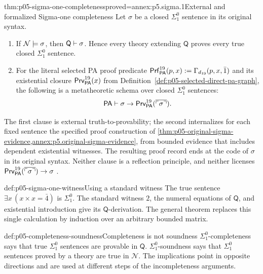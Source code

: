 \begin{hbtheorem}{thm:p05-sigma-one-completeness}{proved=annex:p5.sigma.1}{External and formalized Sigma-one completeness}
Let \(\sigma\) be a closed \(\Sigma^0_1\) sentence in its original syntax.
\begin{enumerate}
  \item If \(\mathcal N\models\sigma\), then
        \(\mathsf Q\vdash\sigma\).  Hence every theory extending
        \(\mathsf Q\) proves every true closed \(\Sigma^0_1\) sentence.
  \item For the literal selected PA proof predicate
        \(\mathsf{Prf}^{19}_{\mathsf{PA}}(p,x)\mathrel{:=}
          \Gamma_{d_{19}}(p,x,\bar1)\) and its existential closure
        \(\mathsf{Prv}^{19}_{\mathsf{PA}}(x)\) from
        Definition~\ref{def:p05-selected-direct-pa-graph}, the following is a
        metatheoretic schema over closed \(\Sigma^0_1\) sentences:
        \[
          \mathsf{PA}\vdash
          \sigma\to
          \mathsf{Prv}^{19}_{\mathsf{PA}}(\overline{\ulcorner\sigma\urcorner}).
        \]
\end{enumerate}
The first clause is external truth-to-provability; the second internalizes
for each fixed sentence the specified proof construction of
\cref{thm:p05-original-sigma-evidence,annex:p5.original-sigma-evidence},
from bounded evidence that includes dependent existential witnesses.
The resulting proof record ends at the code of \(\sigma\) in its
original syntax. Neither clause is a reflection
principle, and neither licenses
\(\mathsf{Prv}^{19}_{\mathsf{PA}}(\overline{\ulcorner\sigma\urcorner})\to\sigma\)
\cite{Shoenfield1967,HilbertBernays1939}.
\end{hbtheorem}

\begin{hbexample}{def:p05-sigma-one-witness}{Using a standard witness}
The true sentence \(\exists x\,(x\times x=\bar4)\) is
\(\Sigma^0_1\).  The standard witness \(2\), the numeral equations of
\(\mathsf Q\), and existential introduction give its
\(\mathsf Q\)-derivation.  The general theorem replaces this single
calculation by induction over an arbitrary bounded matrix.
\end{hbexample}

\begin{hbwarning}{def:p05-completeness-soundness}{Completeness is not soundness}
\(\Sigma^0_1\)-completeness says that true \(\Sigma^0_1\) sentences are
provable in \(\mathsf Q\).  \(\Sigma^0_1\)-soundness says that
\(\Sigma^0_1\) sentences proved by a theory are true in
\(\mathcal N\).  The implications point in opposite
directions and are used at different steps of the incompleteness arguments.
\end{hbwarning}

